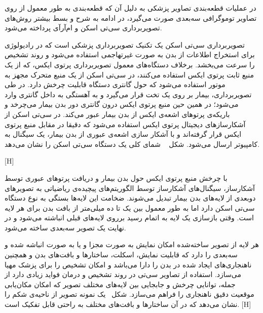 در عملیات قطعه‌بندی تصاویر پزشکی به دلیل آن که قطعه‌بندی به طور معمول از روی تصاویر توموگرافی سه‌بعدی صورت می‌گیرد، در ادامه به شرح و بسط بیشتر روش‌های تصویربرداری سی‌تی اسکن و ام‌آرآی پرداخته می‌شود. 
 

تصویربرداری سی‌تی اسکن یک تکنیک تصویربرداری پزشکی است که در رادیولوژی برای استخراج اطلاعات از بدن به صورت غیرتهاجمی استفاده می‌شود و روند تشخیص را سرعت می‌بخشد. برخلاف دستگاه‌های معمول تصویربرداری پرتوی ایکس، که از یک منبع ثابت پرتوی ایکس استفاده می‌کنند، در سی‌تی اسکن از یک منبع متحرک مجهز به موتور استفاده می‌شود که حول گانتری دستگاه قابلیت چرخش دارد. در طی تصویربرداری، بیمار بر روی یک تخت قرار می‌گیرد و به آهستگی به داخل گانتری وارد می‌شود؛ در همین حین منبع پرتوی ایکس درون گانتری دور بدن بیمار می‌چرخد و باریکه‌ی پرتوهای اشعه‌ی ایکس از بدن بیمار عبور می‌کند. در سی‌تی اسکن  از آشکارسازهای دیجیتال پرتوی ایکس استفاده می‌شود که دقیقا در مقابل منبع پرتوی‌ ایکس قرار گرفته‌اند و با آشکار سازی اشعه‌ی عبوری از بدن بیمار، یک سیگنال به کامپیوتر ارسال می‌شود. شکل ~ شمای کلی یک دستگاه سی‌تی اسکن را نشان می‌دهد.

[H]

با چرخش منبع پرتوی ایکس حول بدن بیمار و دریافت پرتوهای عبوری توسط آشکارساز، سیگنال‌های آشکارساز توسط الگوریتم‌های پیچیده‌ی ریاضیاتی به تصویرهای دوبعدی از لایه‌های بدن بیمار تبدیل می‌شوند. ضخامت این لایه‌ها بستگی به نوع دستگاه سی‌تی اسکن دارد اما به طور معمول بین یک تا ده میلی‌متر از بافت بدن برای هر لایه است. وقتی بازسازی یک لایه به اتمام رسید برروی لایه‌های قبلی انباشته می‌شود و در نهایت یک تصویر سه‌بعدی ساخته می‌شود.

هر لایه از تصویر ساخته‌شده امکان نمایش به صورت مجزا و یا به صورت انباشه شده و سه‌بعدی را دارد که قابلیت نمایش، اسکلت، ساختارها و بافت‌های بدن و همچنین ناهنجاری‌های ایجاد شده در بدن را دارا می‌باشد و امکان تشخیص را برای پزشک مهیا می‌سازد. استفاده از تصاویر سی‌تی در روند تشخیص و درمان فواید زیادی دارد از جمله، توانایی چرخش و جابجایی بین لایه‌های مختلف تصویر که امکان مکان‌یابی موقعیت دقیق ناهنجاری را فراهم می‌سازد. شکل~ یک نمونه تصویر از ناحیه‌ی شکم را نشان می‌دهد که در آن ساختارها و بافت‌های مختلف به راحتی قابل تفکیک است.
[H]

